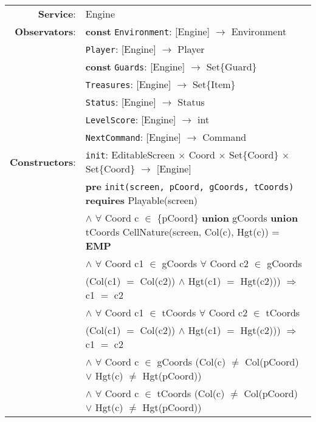 \documentclass[8pt]{article}
\begin{document}
{\small
\begin{longtable}{rl}
  \textbf{Service}: & \textrm{Engine}  \\
  \textbf{Observators}: & \textbf{const} \texttt{Environment}: \textrm{[Engine]} $\rightarrow$ \textrm{Environment} \\
  & \texttt{Player}: \textrm{[Engine]} $\rightarrow$ \textrm{Player} \\
  & \textbf{const} \texttt{Guards}: \textrm{[Engine]} $\rightarrow$ \textrm{Set\{Guard\}} \\
  & \texttt{Treasures}: \textrm{[Engine]} $\rightarrow$ \textrm{Set\{Item\}} \\
  & \texttt{Status}: \textrm{[Engine]} $\rightarrow$ \textrm{Status} \\
  & \texttt{LevelScore}: \textrm{[Engine]} $\rightarrow$ \textrm{int} \\
  & \texttt{NextCommand}: \textrm{[Engine]} $\rightarrow$ \textrm{Command} \\
  \textbf{Constructors}: &\texttt{init}: \textrm{EditableScreen} $\times$ \textrm{Coord} $\times$ \textrm{Set\{Coord\}} $\times$ \textrm{Set\{Coord\}} $\rightarrow$ \textrm{[Engine]} \\
  & \quad \textbf{pre} \texttt{init(screen, pCoord, gCoords, tCoords)} \textbf{requires} \textrm{Playable(screen)}\\
  & \quad\quad\quad $\land$ $\forall$ \textrm{Coord} c $\in$ \{pCoord\} \textbf{union} gCoords \textbf{union} tCoords \textrm{CellNature(screen, Col(c), Hgt(c))} = \textbf{EMP} \\
  & \quad\quad\quad $\land$ $\forall$ \textrm{Coord} c1 $\in$ gCoords $\forall$ \textrm{Coord} c2 $\in$ gCoords \\
  & \quad\quad\quad\quad\quad (\textrm{Col(c1)} $=$ \textrm{Col(c2))} $\land$ \textrm{Hgt(c1)} $=$ \textrm{Hgt(c2))}) $\Rightarrow$ c1 $=$ c2\\
  & \quad\quad\quad $\land$ $\forall$ \textrm{Coord} c1 $\in$ tCoords $\forall$ \textrm{Coord} c2 $\in$ tCoords \\
  & \quad\quad\quad\quad\quad (\textrm{Col(c1)} $=$ \textrm{Col(c2))} $\land$ \textrm{Hgt(c1)} $=$ \textrm{Hgt(c2))}) $\Rightarrow$ c1 $=$ c2\\
  & \quad\quad\quad $\land$ $\forall$ \textrm{Coord} c $\in$ gCoords (\textrm{Col(c)} $\neq$ \textrm{Col(pCoord)} $\lor$ \textrm{Hgt(c)} $\neq$ \textrm{Hgt(pCoord)})\\
  & \quad\quad\quad $\land$ $\forall$ \textrm{Coord} c $\in$ tCoords (\textrm{Col(c)} $\neq$ \textrm{Col(pCoord)} $\lor$ \textrm{Hgt(c)} $\neq$ \textrm{Hgt(pCoord)})\\

\end{longtable}}
\end{document}
